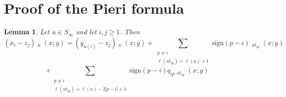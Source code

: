 \documentclass{amsart}
\newtheorem{lemma}{Lemma}[section]
\newtheorem{theorem}[lemma]{Theorem}
\theoremstyle{definition}
\theoremstyle{remark}
\numberwithin{equation}{section}
\DeclareMathOperator{\sch}{\mathfrak{S}}
\DeclareMathOperator{\qsch}{\widetilde{\mathfrak{S}}}
\newcommand{\xrightsquigarrow}[2][]{%
	\mathrel{\mathop{\rightsquigarrow}\limits^{\scriptstyle #2}%
	\ifx\hfuzz#1\hfuzz\else_{\scriptstyle #1}\fi}%
}
\newcommand{\tom}[1]{\ensuremath{\xrightsquigarrow{#1}}}
\begin{document}


\section{Proof of the Pieri formula}

\begin{lemma} \label{lemma:singlevariable}
Let $u\in S_\infty$ and let $i,j\geq 1$. Then
$$(x_i-z_j)\qsch_u(x;y)=(y_{u(i)}-z_j)\qsch_u(x;y)+\sum_{\substack{p\neq i\\\ell(ut_{ip})=\ell(u)+1}}\mathrm{sign}(p-i)\qsch_{ut_{ip}}(x;y)$$
$$+\sum_{\substack{p\neq i\\\ell(ut_{ip})=\ell(u)-2|p-i|+1}}\mathrm{sign}(p-i)q_{ip}\qsch_{ut_{ip}}(x;y)$$
\end{lemma}

\end{document}
